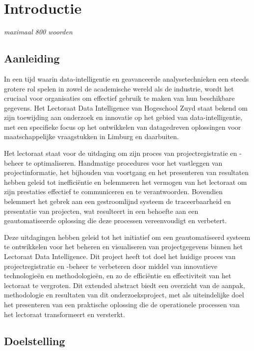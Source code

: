 \chapter{Introductie}

\emph{maximaal 800 woorden}

\section*{Aanleiding}

In een tijd waarin data-intelligentie en geavanceerde analysetechnieken een steeds grotere rol spelen in zowel de academische wereld als de industrie, wordt het cruciaal voor organisaties om effectief gebruik te maken van hun beschikbare gegevens. Het Lectoraat Data Intelligence van Hogeschool Zuyd staat bekend om zijn toewijding aan onderzoek en innovatie op het gebied van data-intelligentie, met een specifieke focus op het ontwikkelen van datagedreven oplossingen voor maatschappelijke vraagstukken in Limburg en daarbuiten. 

Het lectoraat staat voor de uitdaging om zijn proces van projectregistratie en -beheer te optimaliseren. Handmatige procedures voor het vastleggen van projectinformatie, het bijhouden van voortgang en het presenteren van resultaten hebben geleid tot inefficiëntie en belemmeren het vermogen van het lectoraat om zijn prestaties effectief te communiceren en te verantwoorden. Bovendien belemmert het gebrek aan een gestroomlijnd systeem de traceerbaarheid en presentatie van projecten, wat resulteert in een behoefte aan een geautomatiseerde oplossing die deze processen vereenvoudigt en verbetert.

Deze uitdagingen hebben geleid tot het initiatief om een geautomatiseerd systeem te ontwikkelen voor het beheren en visualiseren van projectgegevens binnen het Lectoraat Data Intelligence. Dit project heeft tot doel het huidige proces van projectregistratie en -beheer te verbeteren door middel van innovatieve technologieën en methodologieën, en zo de efficiëntie en effectiviteit van het lectoraat te vergroten. Dit extended abstract biedt een overzicht van de aanpak, methodologie en resultaten van dit onderzoeksproject, met als uiteindelijke doel het presenteren van een praktische oplossing die de operationele processen van het lectoraat transformeert en versterkt.


\section*{Doelstelling}

